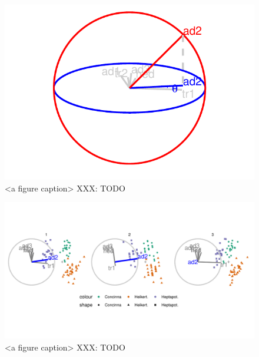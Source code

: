 \documentclass{monashthesis}
\begin{document}
\begin{figure}

{\centering \includegraphics[width=1\linewidth,]{./figures_from_script/ch3_fig2_manip_sp} 

}

\caption{<a figure caption> XXX: TODO}\label{fig:ch3fig2}
\end{figure}

\begin{figure}

{\centering \includegraphics[width=1\linewidth,]{./figures_from_script/ch3_fig3_filmstrip} 

}

\caption{<a figure caption> XXX: TODO}\label{fig:ch3fig3}
\end{figure}
\end{document}
